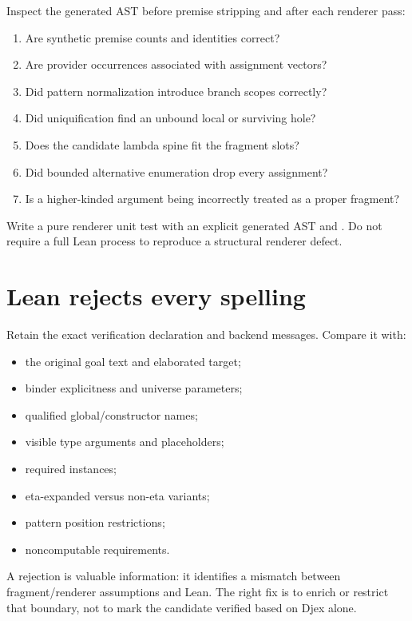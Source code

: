 \documentclass[10pt,letterpaper,oneside]{report}
\newcommand{\code}[1]{\texttt{\detokenize{#1}}}
\begin{document}
Inspect the generated AST before premise stripping and after each renderer pass:

\begin{enumerate}
  \item Are synthetic premise counts and identities correct?
  \item Are provider occurrences associated with assignment vectors?
  \item Did pattern normalization introduce branch scopes correctly?
  \item Did uniquification find an unbound local or surviving hole?
  \item Does the candidate lambda spine fit the fragment slots?
  \item Did bounded alternative enumeration drop every assignment?
  \item Is a higher-kinded argument being incorrectly treated as a proper fragment?
\end{enumerate}

Write a pure renderer unit test with an explicit generated AST and \code{Frag}. Do not require a full Lean process to reproduce a structural renderer defect.

\section{Lean rejects every spelling}

Retain the exact verification declaration and backend messages. Compare it with:

\begin{itemize}
  \item the original goal text and elaborated target;
  \item binder explicitness and universe parameters;
  \item qualified global/constructor names;
  \item visible type arguments and placeholders;
  \item required instances;
  \item eta-expanded versus non-eta variants;
  \item pattern position restrictions;
  \item noncomputable requirements.
\end{itemize}

A rejection is valuable information: it identifies a mismatch between fragment/renderer assumptions and Lean. The right fix is to enrich or restrict that boundary, not to mark the candidate verified based on Djex alone.
\end{document}
